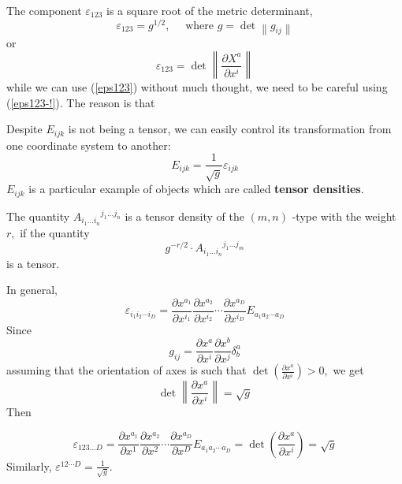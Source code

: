 \begin{qt}
The component $\varepsilon_{123}$ is a square root of the metric determinant,
\begin{equation}
    \varepsilon_{123}=g^{1 / 2}, \quad \text { where } g=\operatorname{det}\left\|g_{i j}\right\|
    \label{eps123-!}
\end{equation}
or
\begin{equation}
    \varepsilon_{123}=\operatorname{det}\left\|\frac{\partial X^{a}}{\partial x^{i}}\right\|
    \label{eps123}
\end{equation}
while we can use (\ref{eps123}) without much thought, we need to be careful using (\ref{eps123-!}). The reason is that 
\end{qt}
Despite $E_{i j k}$ is not being a tensor, we can easily control its transformation from one coordinate system to another:
$$
E_{i j k}=\frac{1}{\sqrt{g}} \varepsilon_{i j k}
$$
$E_{i j k}$ is a particular example of objects which are called \textbf{tensor densities}.
\begin{defi}
        The quantity $A_{i_{1} \ldots i_{n}}{}^{j_{1} \ldots j_{n}}$ is a tensor density of the $(m, n)$ -type with the weight $r,$ if the quantity
        $$
g^{-r / 2} \cdot A_{i_{1} \ldots i_{n}}{}^{j_{1} \ldots j_{m}}
$$
is a tensor.
\end{defi}
In general,
\begin{equation}
\varepsilon_{i_{1} i_{2} \cdots i_{D}}=\frac{\partial x^{a_{1}}}{\partial x^{i_{1}}} \frac{\partial x^{a_{2}}}{\partial x^{i_{2}}} \cdots \frac{\partial x^{a_{D}}}{\partial x^{i_{D}}} E_{a_{1} a_{2} \cdots a_{D}}
\end{equation}
Since
\begin{equation}
g_{i j}=\frac{\partial x^{a}}{\partial x^{i}} \frac{\partial x^{b}}{\partial x^{j}} \delta_{b}^{a}
\end{equation}
assuming that the orientation of axes is such that $\operatorname{det}\left(\frac{\partial x^{a}}{\partial x^{i}}\right)>0,$ we get
\begin{equation}
\operatorname{det}\left\|\frac{\partial x^{a}}{\partial x^{i}}\right\|=\sqrt{g}
\end{equation}
Then
\begin{qt}
\begin{equation}
\varepsilon_{123 \dots D}=\frac{\partial x^{a_{1}}}{\partial x^{1}} \frac{\partial x^{a_{2}}}{\partial x^{2}} \cdots \frac{\partial x^{a_{D}}}{\partial x^{D}} E_{a_{1} a_{2} \cdots a_{D}}=\operatorname{det}\left(\frac{\partial x^{a}}{\partial x^{i}}\right)=\sqrt{g}
\end{equation}
Similarly, $\varepsilon^{12 \cdots D}=\frac{1}{\sqrt{g}}$.
\end{qt}

